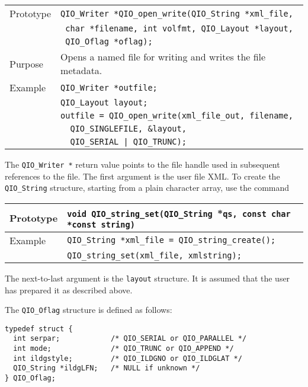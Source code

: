 \documentclass{article}
\newcommand{\QIOstring}{{\tt QIO\_String }}
\begin{document}
\begin{flushleft}
  \begin{tabular}{|l|l|}
  \hline
  Prototype      & \verb|QIO_Writer *QIO_open_write(|\QIOstring \verb|*xml_file,|\\
		 & \verb| char *filename, int volfmt, QIO_Layout *layout, | \\
                 & \verb| QIO_Oflag *oflag);| \\
  Purpose        & Opens a named file for writing and writes the file metadata. \\
\hline
  Example  & \verb|QIO_Writer *outfile;| \\
           & \verb|QIO_Layout layout;| \\
           & \verb|outfile = QIO_open_write(xml_file_out, filename, |\\
	   & \verb|  QIO_SINGLEFILE, &layout, |\\
           & \verb+  QIO_SERIAL | QIO_TRUNC); +\\
   \hline
 \end{tabular}
\end{flushleft}
%
The \verb|QIO_Writer *| return value points to the file handle used in
subsequent references to the file.  The first argument is the user
file XML.  To create the \verb|QIO_String| structure, starting from a
plain character array, use the command

\begin{flushleft}
  \begin{tabular}{|l|l|}
  \hline
  Prototype      & \verb|void QIO_string_set(|\QIOstring *\verb|qs, const char *const string)|\\
  \hline
   Example    & \QIOstring \verb|*xml_file = QIO_string_create();|\\
              & \verb|QIO_string_set(xml_file, xmlstring);|\\
   \hline
 \end{tabular}
\end{flushleft}

The next-to-last argument is the \verb|layout| structure.  It is
assumed that the user has prepared it as described above.

The \verb|QIO_Oflag| structure is defined as follows:
%
\begin{verbatim}
typedef struct {
  int serpar;            /* QIO_SERIAL or QIO_PARALLEL */
  int mode;              /* QIO_TRUNC or QIO_APPEND */
  int ildgstyle;         /* QIO_ILDGNO or QIO_ILDGLAT */
  QIO_String *ildgLFN;   /* NULL if unknown */
} QIO_Oflag;
\end{verbatim}
%
\end{document}
